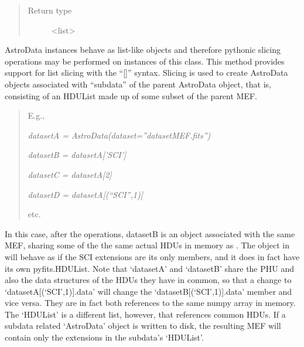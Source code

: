 \documentclass[letterpaper,10pt,english]{sphinxmanual}
\begin{document}
\begin{fulllineitems}
\begin{fulllineitems}
\begin{quote}
\begin{description}
\item[{Return type}] \leavevmode
\textless{}list\textgreater{}

\end{description}\end{quote}

\end{fulllineitems}


\begin{fulllineitems}
\label{astro_class:astrodata.AstroData.AstroData.__getitem__}
AstroData instances behave as list-like objects and therefore pythonic
slicing operations may be performed on instances of this class.
This method provides support for list slicing with the ``{[}{]}'' syntax.
Slicing is used to create AstroData objects associated with ``subdata'' 
of the parent AstroData object, that is, consisting of
an HDUList made up of some subset of the parent MEF.
\begin{quote}

E.g.,

\emph{datasetA = AstroData(dataset=''datasetMEF.fits'')}

\emph{datasetB = datasetA{[}'SCI'{]}}

\emph{datasetC = datasetA{[}2{]}}

\emph{datasetD = datasetA{[}(``SCI'',1){]}}

etc.
\end{quote}

In this case, after the operations, datasetB is an  object
associated with the same MEF, sharing some of the the same actual HDUs
in memory as . The object in  will behave as if
the SCI extensions are its only members, and it does in fact have its 
own pyfits.HDUList. Note that `datasetA' and `datasetB' share the 
PHU and also the data structures of the HDUs they have in common, so 
that a change to `datasetA{[}(`SCI',1){]}.data' will change the 
`datasetB{[}(`SCI',1){]}.data' member and vice versa. They are in fact both
references to the same numpy array in memory. The `HDUList' is a 
different list, however, that references common HDUs. If a subdata 
related `AstroData' object is written to disk, the resulting MEF will
contain only the extensions in the subdata's `HDUList'.


\end{fulllineitems}
\end{fulllineitems}
\end{document}

